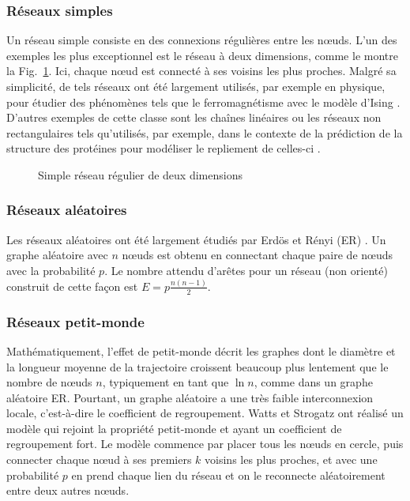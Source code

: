 \subsubsection{Réseaux simples}
Un réseau simple consiste en des connexions régulières entre les nœuds. L'un des exemples les plus exceptionnel est le réseau à deux dimensions, comme le montre la Fig.~\ref{Ising2}. Ici, chaque nœud est connecté à ses voisins les plus proches. Malgré sa simplicité, de tels réseaux ont été largement utilisés, par exemple en physique, pour étudier des phénomènes tels que le ferromagnétisme avec le modèle d'Ising \cite{Chowdhury-Stauffer2000}. D'autres exemples de cette classe sont les chaînes linéaires ou les réseaux non rectangulaires tels qu'utilisés, par exemple, dans le contexte de la prédiction de la structure des protéines pour modéliser le repliement de celles-ci \cite{Hsu-al2003,Dehmer2011}.
\begin{figure}[h!]
	\centering
{}
\caption{Simple réseau régulier de deux dimensions}
\label{Ising2}
\end{figure}
\subsubsection{Réseaux aléatoires}
Les réseaux aléatoires ont été largement étudiés par Erdös et Rényi (ER) \cite{Erdos-Renyi1959,Erdos-Renyi1960,Erdos-Renyi1961}.
Un graphe aléatoire avec $n$ nœuds est obtenu en connectant chaque paire de nœuds avec la probabilité $p$. Le nombre attendu d'arêtes pour un réseau (non orienté) construit
de cette façon est $E=p\frac{n(n-1)}{2}$.
\subsubsection{Réseaux petit-monde}
Mathématiquement, l'effet de petit-monde décrit les graphes dont le diamètre et la longueur moyenne de la trajectoire croissent beaucoup plus lentement que le nombre de nœuds $n$, typiquement en tant que $\ln n$, comme dans un graphe aléatoire ER. Pourtant, un graphe aléatoire a une très faible interconnexion locale, c'est-à-dire le coefficient de regroupement. Watts et Strogatz \cite{Watss-Strogatz1998} ont réalisé un modèle qui rejoint la propriété petit-monde et ayant un coefficient de regroupement fort. Le modèle commence par placer tous les nœuds en cercle, puis connecter chaque nœud à ses premiers $k$ voisins les plus proches, et  avec une probabilité $p$ en prend chaque lien du réseau et on le reconnecte aléatoirement entre deux autres nœuds.
